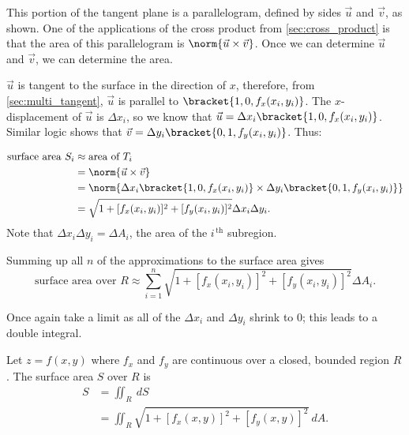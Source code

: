 This portion of the tangent plane is a parallelogram, defined by sides $\vec u$ and $\vec v$, as shown. One of the applications of the cross product from \autoref{sec:cross_product} is that the area of this parallelogram is $\norm{\vec u\times \vec v}$. Once we can determine $\vec u$ and $\vec v$, we can determine the area.

$\vec u$ is tangent to the surface in the direction of $x$, therefore, from \autoref{sec:multi_tangent}, $\vec u$ is parallel to $\bracket{1,0,f_x(x_i,y_i)}$. The $x$-displacement of $\vec u$ is $\Delta x_i$, so we know that $\vec u = \Delta x_i\bracket{1,0,f_x(x_i,y_i)}$. Similar logic shows that $\vec v = \Delta y_i\bracket{0,1,f_y(x_i,y_i)}$. Thus:

\begin{align*}
\text{surface area $S_i$}
	&\approx \text{area of  $T_i$}\\
	&= \norm{\vec u\times \vec v}\\
	&= \norm{\Delta x_i\bracket{1,0,f_x(x_i,y_i)}\times\Delta y_i\bracket{0,1,f_y(x_i,y_i)}}\\
	&=\sqrt{1+[f_x(x_i,y_i)]^2+[f_y(x_i,y_i)]^2}\Delta x_i\Delta y_i.
\end{align*}
Note that $\Delta x_i\Delta y_i = \Delta A_i$, the area of the $i^{\,\text{th}}$ subregion.

Summing up all $n$ of the approximations to the surface area gives
\[\text{surface area over $R$} \approx \sum_{i=1}^n \sqrt{1+[f_x(x_i,y_i)]^2+[f_y(x_i,y_i)]^2}\Delta A_i.\]

Once again take a limit as all of the $\Delta x_i$ and $\Delta y_i$ shrink to 0; this leads to a double integral.


\begin{definition}\label{def:surfacearea}
Let $z=f(x,y)$ where $f_x$ and $f_y$ are continuous over a closed, bounded region $R$. The surface area $S$ over $R$ is 
\begin{align*}
S &= \iint_R \ dS\\
&=\iint_R \sqrt{1+[f_x(x,y)]^2+[f_y(x,y)]^2}\ dA.
\end{align*}
\end{definition}

